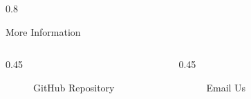 \documentclass[final]{beamer}
\newlength{\sepwidth}
\newlength{\colwidth}
\newcommand{\separatorcolumn}{\begin{column}{\sepwidth}\end{column}}
\begin{document}
\begin{frame}[t]
\begin{columns}[t]
\begin{column}{0.8\colwidth}
\begin{block}{More Information}

\begin{columns}[t]
    \begin{column}{0.45 \colwidth}
    \vspace{-20pt}
    \begin{figure}
        \centering
    \vspace{-10pt}
        \caption{GitHub Repository}
    \end{figure}
    \end{column}


      \begin{column}{0.45 \colwidth}
    \vspace{-20pt}
      \begin{figure}
        \centering
      \vspace{-10pt}
        \caption{Email Us}
    \end{figure}
      \end{column}
      
  \end{columns}


    
\end{block}

  

\end{column}

\separatorcolumn
\end{columns}
\end{frame}
\end{document}
